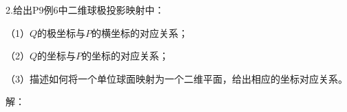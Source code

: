 2.给出P9例6中二维球极投影映射中：
  
（1）$Q$的极坐标与$P$的横坐标的对应关系；
  
（2）$Q$的坐标与$P$的坐标的对应关系；
  
（3）描述如何将一个单位球面映射为一个二维平面，给出相应的坐标对应关系。

解：
\begin{center}
	\quad
\end{center}
